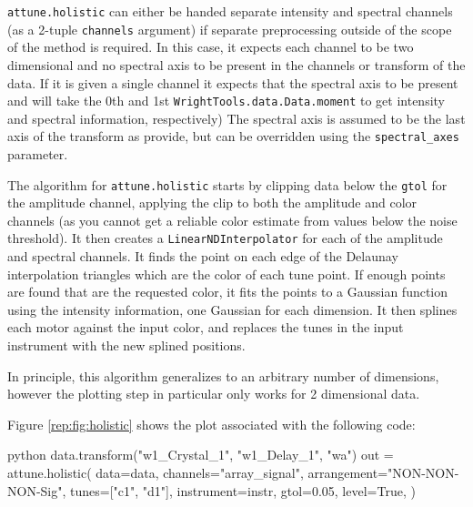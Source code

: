 \texttt{attune.holistic} can either be handed separate
intensity and spectral channels (as a 2-tuple \texttt{channels}
argument) if separate preprocessing outside of the scope of the method
is required. In this case, it expects each channel to be two dimensional
and no spectral axis to be present in the channels or transform of the
data. If it is given a single channel it expects that the spectral axis
to be present and will take the 0th and 1st
\texttt{WrightTools.data.Data.moment} to get intensity and spectral
information, respectively) The spectral axis is assumed to be the last
axis of the transform as provide, but can be overridden using the
\texttt{spectral\_axes} parameter.

The algorithm for \texttt{attune.holistic} starts by
clipping data below the \texttt{gtol} for the amplitude channel,
applying the clip to both the amplitude and color channels (as you
cannot get a reliable color estimate from values below the noise
threshold). It then creates a
\texttt{LinearNDInterpolator} for each of the
amplitude and spectral channels. It finds the point on each edge of the
Delaunay interpolation triangles which are the
color of each tune point. If enough points are found that are the
requested color, it fits the points to a Gaussian function using the
intensity information, one Gaussian for each dimension. It then splines
each motor against the input color, and replaces the tunes in the input
instrument with the new splined positions.

In principle, this algorithm generalizes to an arbitrary number of
dimensions, however the plotting step in particular only works for 2
dimensional data.

Figure \ref{rep:fig:holistic} shows the plot associated with the following code:

\begin{codefragment}{python}
data.transform("w1_Crystal_1", "w1_Delay_1", "wa")
out = attune.holistic(
    data=data,
    channels="array_signal",
    arrangement="NON-NON-NON-Sig",
    tunes=["c1", "d1"],
    instrument=instr,
    gtol=0.05,
    level=True,
)
\end{codefragment}

